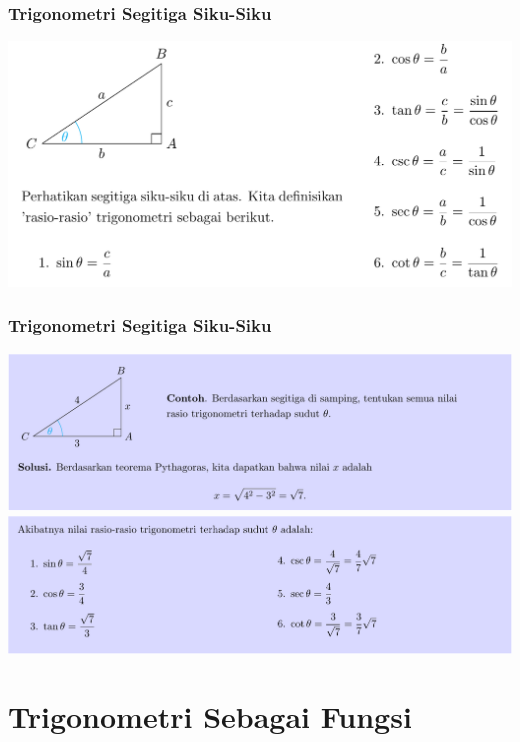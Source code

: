 \documentclass[pdflatex,compress,mathserif]{beamer}
\begin{document}
\begin{frame}
	\frametitle{Trigonometri Segitiga Siku-Siku}
	\begin{center}
		\includegraphics[width=\linewidth]{img/img03}
	\end{center}
\end{frame}

\begin{frame}
	\frametitle{Trigonometri Segitiga Siku-Siku}
	\begin{center}
		\includegraphics[width=\linewidth]{img/img04}
		\includegraphics[width=\linewidth]{img/img05}
	\end{center}
\end{frame}

\section{Trigonometri Sebagai Fungsi}
\end{document}
